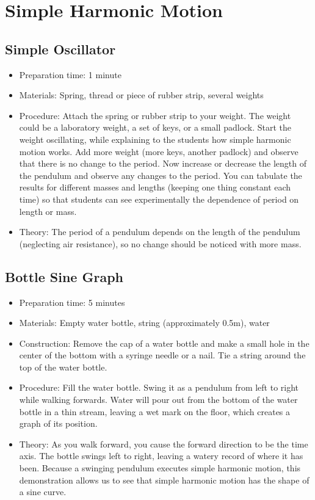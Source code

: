 \section{Simple Harmonic Motion}

\subsection{Simple Oscillator}
\begin{itemize}
\item{Preparation time: 1 minute}
\item{Materials: Spring, thread or piece of rubber strip, several weights}
\item{Procedure: Attach the spring or rubber strip to your weight. The weight could be a laboratory weight, a set of keys, or a small padlock. Start the weight oscillating, while explaining to the students how simple harmonic motion works. Add more weight (more keys, another padlock) and observe that there is no change to the period. Now increase or decrease the length of the pendulum and observe any changes to the period. You can tabulate the results for different masses and lengths (keeping one thing constant each time) so that students can see experimentally the dependence of period on length or mass.}
\item{Theory: The period of a pendulum depends on the length of the pendulum (neglecting air resistance), so no change should be noticed with more mass.}
\end{itemize}

\subsection{Bottle Sine Graph}
\begin{itemize}
\item{Preparation time: 5 minutes}
\item{Materials: Empty water bottle, string (approximately 0.5m), water}
\item{Construction: Remove the cap of a water bottle and make a small hole in the center of the bottom with a syringe needle or a nail. Tie a string around the top of the water bottle.}
\item{Procedure: Fill the water bottle. Swing it as a pendulum from left to right while walking forwards. Water will pour out from the bottom of the water bottle in a thin stream, leaving a wet mark on the floor, which creates a graph of its position.}
\item{Theory: As you walk forward, you cause the forward direction to be the time axis. The bottle swings left to right, leaving a watery record of where it has been. Because a swinging pendulum executes simple harmonic motion, this demonstration allows us to see that simple harmonic motion has the shape of a sine curve.}
\end{itemize}

